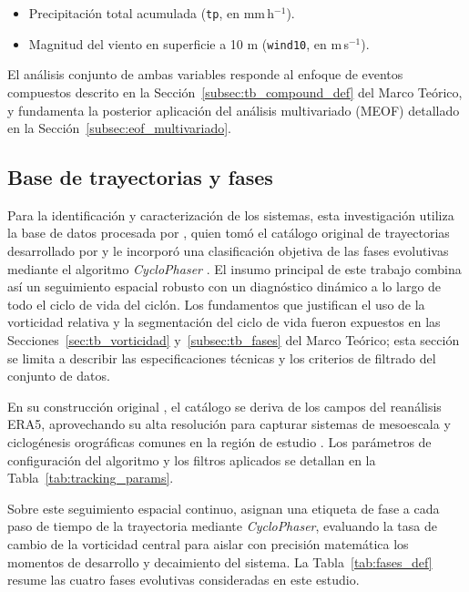 \begin{itemize}
    \item Precipitación total acumulada (\texttt{tp}, en mm\,h$^{-1}$).
    \item Magnitud del viento en superficie a 10 m (\texttt{wind10}, en m\,s$^{-1}$).
\end{itemize}

El análisis conjunto de ambas variables responde al enfoque de eventos compuestos descrito en la Sección~\ref{subsec:tb_compound_def} del Marco Teórico, y fundamenta la posterior aplicación del análisis multivariado (MEOF) detallado en la Sección~\ref{subsec:eof_multivariado}.

\subsection{Base de trayectorias y fases}\label{sec:bd_ciclones}

Para la identificación y caracterización de los sistemas, esta investigación utiliza la base de datos procesada por \citet{coutodesouza2024new}, quien tomó el catálogo original de trayectorias desarrollado por \citet{gramcianinov2019properties} y le incorporó una clasificación objetiva de las fases evolutivas mediante el algoritmo \textit{CycloPhaser} \citep{deSouza2025CycloPhaser}. El insumo principal de este trabajo combina así un seguimiento espacial robusto con un diagnóstico dinámico a lo largo de todo el ciclo de vida del ciclón. Los fundamentos que justifican el uso de la vorticidad relativa y la segmentación del ciclo de vida fueron expuestos en las Secciones~\ref{sec:tb_vorticidad} y~\ref{subsec:tb_fases} del Marco Teórico; esta sección se limita a describir las especificaciones técnicas y los criterios de filtrado del conjunto de datos.

En su construcción original \citep{gramcianinov2019properties}, el catálogo se deriva de los campos del reanálisis ERA5, aprovechando su alta resolución para capturar sistemas de mesoescala y ciclogénesis orográficas comunes en la región de estudio \citep{gramcianinov2020analysis}. Los parámetros de configuración del algoritmo y los filtros aplicados se detallan en la Tabla~\ref{tab:tracking_params}.



Sobre este seguimiento espacial continuo, \citet{coutodesouza2024new} asignan una etiqueta de fase a cada paso de tiempo de la trayectoria mediante \textit{CycloPhaser}, evaluando la tasa de cambio de la vorticidad central para aislar con precisión matemática los momentos de desarrollo y decaimiento del sistema. La Tabla~\ref{tab:fases_def} resume las cuatro fases evolutivas consideradas en este estudio.

